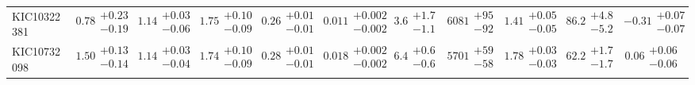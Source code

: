 \begin{tabular}{lcccccccccc}
  KIC10322381 &  $0.78\substack{+0.23 \\ -0.19}$ &  $1.14\substack{+0.03 \\ -0.06}$ &  $1.75\substack{+0.10 \\ -0.09}$ &  $0.26\substack{+0.01 \\ -0.01}$ &  $0.011\substack{+0.002 \\ -0.002}$ &  $3.6\substack{+1.7 \\ -1.1}$ &  $6081\substack{+95 \\ -92}$ &  $1.41\substack{+0.05 \\ -0.05}$ &   $86.2\substack{+4.8 \\ -5.2}$ &          $-0.31\substack{+0.07 \\ -0.07}$ \\
  KIC10732098 &  $1.50\substack{+0.13 \\ -0.14}$ &  $1.14\substack{+0.03 \\ -0.04}$ &  $1.74\substack{+0.10 \\ -0.09}$ &  $0.28\substack{+0.01 \\ -0.01}$ &  $0.018\substack{+0.002 \\ -0.002}$ &  $6.4\substack{+0.6 \\ -0.6}$ &  $5701\substack{+59 \\ -58}$ &  $1.78\substack{+0.03 \\ -0.03}$ &   $62.2\substack{+1.7 \\ -1.7}$ &           $0.06\substack{+0.06 \\ -0.06}$ \\
\bottomrule
\end{tabular}
